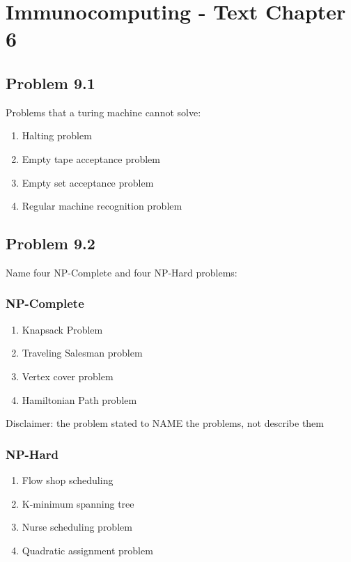 
\chapter{Immunocomputing - Text Chapter 6}

\section{Problem 9.1}

Problems that a turing machine cannot solve:
\begin{enumerate}
\item	Halting problem
\item	Empty tape acceptance problem
\item	Empty set acceptance problem
\item	Regular machine recognition problem
\end{enumerate}

\section{Problem 9.2}

Name four NP-Complete and four NP-Hard problems:

\subsection{NP-Complete}

\begin{enumerate}
\item	Knapsack Problem
\item	Traveling Salesman problem
\item	Vertex cover problem
\item	Hamiltonian Path problem
\end{enumerate}

Disclaimer: the problem stated to NAME the problems, not describe them

\subsection{NP-Hard}
\begin{enumerate}
\item	Flow shop scheduling
\item	K-minimum spanning tree
\item	Nurse scheduling problem
\item	Quadratic assignment problem
\end{enumerate}


